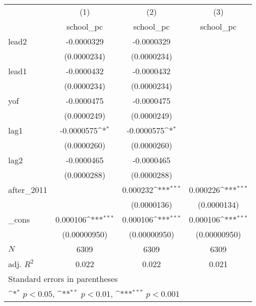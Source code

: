{
\def\sym#1{\ifmmode^{#1}\else\(^{#1}\)\fi}
\begin{tabular}{l*{3}{c}}
\hline\hline
            &\multicolumn{1}{c}{(1)}&\multicolumn{1}{c}{(2)}&\multicolumn{1}{c}{(3)}\\
            &\multicolumn{1}{c}{school\_pc}&\multicolumn{1}{c}{school\_pc}&\multicolumn{1}{c}{school\_pc}\\
\hline
lead2       &  -0.0000329         &  -0.0000329         &                     \\
            & (0.0000234)         & (0.0000234)         &                     \\
[1em]
lead1       &  -0.0000432         &  -0.0000432         &                     \\
            & (0.0000234)         & (0.0000234)         &                     \\
[1em]
yof         &  -0.0000475         &  -0.0000475         &                     \\
            & (0.0000249)         & (0.0000249)         &                     \\
[1em]
lag1        &  -0.0000575\sym{*}  &  -0.0000575\sym{*}  &                     \\
            & (0.0000260)         & (0.0000260)         &                     \\
[1em]
lag2        &  -0.0000465         &  -0.0000465         &                     \\
            & (0.0000288)         & (0.0000288)         &                     \\
[1em]
after\_2011  &                     &    0.000232\sym{***}&    0.000226\sym{***}\\
            &                     & (0.0000136)         & (0.0000134)         \\
[1em]
\_cons      &    0.000106\sym{***}&    0.000106\sym{***}&    0.000106\sym{***}\\
            &(0.00000950)         &(0.00000950)         &(0.00000950)         \\
\hline
\(N\)       &        6309         &        6309         &        6309         \\
adj. \(R^{2}\)&       0.022         &       0.022         &       0.021         \\
\hline\hline
\multicolumn{4}{l}{\footnotesize Standard errors in parentheses}\\
\multicolumn{4}{l}{\footnotesize \sym{*} \(p<0.05\), \sym{**} \(p<0.01\), \sym{***} \(p<0.001\)}\\
\end{tabular}
}
